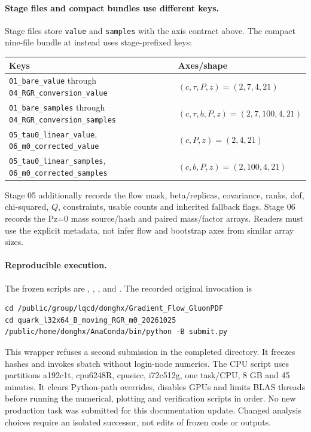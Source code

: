 \documentclass[11pt]{article}
\numberwithin{equation}{section}
\begin{document}
\paragraph{Stage files and compact bundles use different keys.}
Stage files store \texttt{value} and \texttt{samples} with the axis contract
above.  The compact nine-file bundle at  instead uses
stage-prefixed keys:
\begin{center}
\begin{tabular}{@{}p{}p{}@{}}
\toprule
Keys & Axes/shape\\
\midrule
\texttt{01\_bare\_value} through
\texttt{04\_RGR\_conversion\_value}
& \((c,\tau,P,z)=(2,7,4,21)\)\\
\texttt{01\_bare\_samples} through
\texttt{04\_RGR\_conversion\_samples}
& \((c,\tau,b,P,z)=(2,7,100,4,21)\)\\
\texttt{05\_tau0\_linear\_value},
\texttt{06\_m0\_corrected\_value}
& \((c,P,z)=(2,4,21)\)\\
\texttt{05\_tau0\_linear\_samples},
\texttt{06\_m0\_corrected\_samples}
& \((c,b,P,z)=(2,100,4,21)\)\\
\bottomrule
\end{tabular}
\end{center}
Stage 05 additionally records the flow mask, beta/replicas, covariance,
ranks, dof, chi-squared, \(Q\), constraints, usable counts and inherited
fallback flags.  Stage 06 records the Pz=0 mass source/hash and paired
mass/factor arrays.  Readers must use the explicit metadata, not infer
flow and bootstrap axes from similar array sizes.

\paragraph{Reproducible execution.}
The frozen scripts are ,
, ,
 and .
The recorded original invocation is
\begin{verbatim}
cd /public/group/lqcd/donghx/Gradient_Flow_GluonPDF
cd quark_l32x64_B_moving_RGR_m0_20261025
/public/home/donghx/AnaConda/bin/python -B submit.py
\end{verbatim}
This wrapper refuses a second submission in the completed directory.
It freezes hashes and invokes sbatch without login-node numerics.
The CPU script uses partitions a192c1t, cpu6248R, cpueicc, i72c512g,
one task/CPU, 8 GB and 45 minutes.  It clears Python-path overrides,
disables GPUs and limits BLAS threads before running the numerical,
plotting and verification scripts in order.  No new production task
was submitted for this documentation update.  Changed analysis choices
require an isolated successor, not edits of frozen code or outputs.
\end{document}
